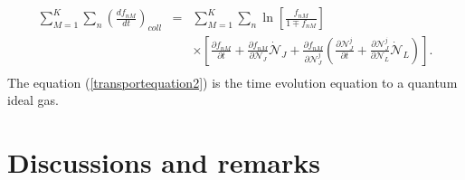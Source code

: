 \documentclass{article}
\begin{document}
\begin{eqnarray}
    \sum_{M=1}^{K}\sum_n \left( \frac{df_{nM}}{dt} \right)_{coll}&=&\sum_{M=1}^{K} \sum_n \ln \left[ \frac{f_{nM}}{1\mp f_{nM}} \right] \nonumber \\
    &&\times \left[ \frac{\partial f_{nM}}{\partial t}+\frac{\partial f_{nM}}{\partial \mathcal{N}_J}\dot{\mathcal{N}}_J+\frac{\partial f_{nM}}{\partial \mathcal{N}_J^{j}}\left( \frac{\partial \mathcal{N}_J^{j}}{\partial t}+\frac{\partial \mathcal{N}_J^{j}}{\partial \mathcal{N}_L}\dot{\mathcal{N}}_L \right) \right].  \nonumber \\ \label{transportequation2}
\end{eqnarray}
The equation (\ref{transportequation2}) is the time evolution equation to a quantum ideal gas. \\


  





\section{Discussions and remarks}
\end{document}
